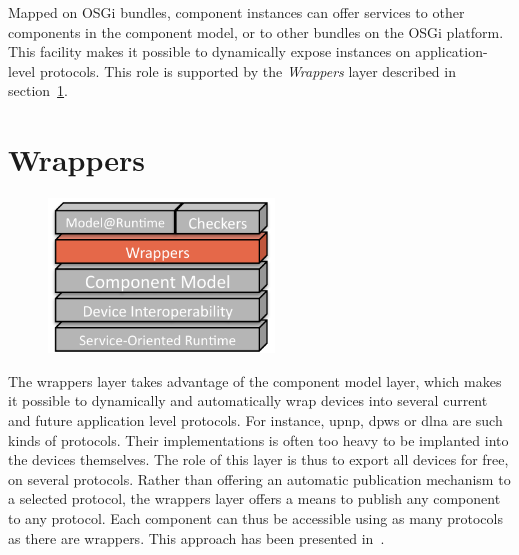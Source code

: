 Mapped on OSGi bundles, component instances can offer services to other components in the component model, or to other bundles on the OSGi platform. This facility makes it possible to dynamically expose instances on application-level protocols. This role is supported by the {\it Wrappers} layer described in section~\ref{sec:wrappers}.

\vspace{1cm}
\section{Wrappers}
\label{sec:wrappers}
\begin{figure}
  \vspace{-5mm}
  \includegraphics[width=60mm]{part2/pics/layers/Wrappers.pdf}
  \vspace{-5mm}
\end{figure}


The wrappers layer takes advantage of the component model layer, which makes it possible to dynamically and automatically wrap devices into several current and future application level protocols. For instance, \gls{upnp}, \gls{dpws} or \gls{dlna} are such kinds of protocols. Their implementations is often too heavy to be implanted into the devices themselves. The role of this layer is thus to export all devices for free, on several protocols. Rather than offering an automatic publication mechanism to a selected protocol, the wrappers layer offers a means to publish any component to any protocol. Each component can thus be accessible using as many protocols as there are wrappers. This approach has been presented in~\cite{Nain08a}.\\

